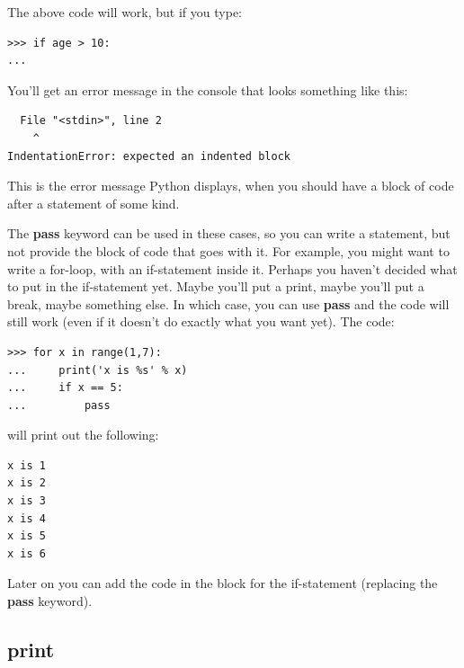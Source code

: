 \noindent
The above code will work, but if you type:

\begin{listingignore}
\begin{verbatim}
>>> if age > 10:
...
\end{verbatim}
\end{listingignore}

\noindent
You'll get an error message in the console that looks something like this:

\begin{listingignore}
\begin{verbatim}
  File "<stdin>", line 2
    ^
IndentationError: expected an indented block
\end{verbatim}
\end{listingignore}

This is the error message Python displays, when you should have a block of code after a statement of some kind.
\par
The \textbf{pass} keyword can be used in these cases, so you can write a statement, but not provide the block of code that goes with it.  For example, you might want to write a for-loop, with an if-statement inside it.  Perhaps you haven't decided what to put in the if-statement yet.  Maybe you'll put a print, maybe you'll put a break, maybe something else.  In which case, you can use \textbf{pass} and the code will still work (even if it doesn't do exactly what you want yet).  The code:

\begin{listing}
\begin{verbatim}
>>> for x in range(1,7):
...     print('x is %s' % x)
...     if x == 5:
...         pass
\end{verbatim}
\end{listing}

\noindent
will print out the following:

\begin{listing}
\begin{verbatim}
x is 1
x is 2
x is 3
x is 4
x is 5
x is 6
\end{verbatim}
\end{listing}

\noindent
Later on you can add the code in the block for the if-statement (replacing the \textbf{pass} keyword).

\subsection*{print}

